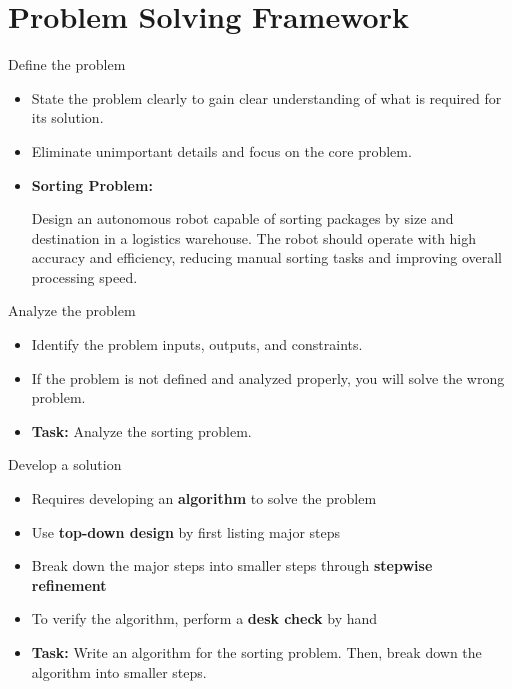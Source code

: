 \documentclass[sectionframe]{oxblue-beamer}
\begin{document}
\section{Problem Solving Framework}

\begin{frame}{Define the problem}
\begin{itemize}
    \item State the problem clearly to gain clear understanding of what is required for its solution.
    \item Eliminate unimportant details and focus on the core problem.
    \item \textbf{Sorting Problem:} \par\smallskip Design an autonomous robot capable of sorting packages by size and destination in a logistics warehouse. The robot should operate with high accuracy and efficiency, reducing manual sorting tasks and improving overall processing speed.
\end{itemize}
\end{frame}

\begin{frame}{Analyze the problem}
\begin{itemize}
    \item Identify the problem inputs, outputs, and constraints.
    \item If the problem is not defined and analyzed properly, you will solve the wrong problem.
    \item \textbf{Task:} Analyze the sorting problem.
\end{itemize}
\end{frame}

\begin{frame}{Develop a solution}
\begin{itemize}
    \item Requires developing an \textbf{algorithm} to solve the problem
    \item Use \textbf{top-down design} by first listing major steps
    \item Break down the major steps into smaller steps through \textbf{stepwise refinement}
    \item To verify the algorithm, perform a \textbf{desk check} by hand
    \item \textbf{Task:} Write an algorithm for the sorting problem. Then, break down the algorithm into smaller steps.
\end{itemize}
\end{frame}
\end{document}
